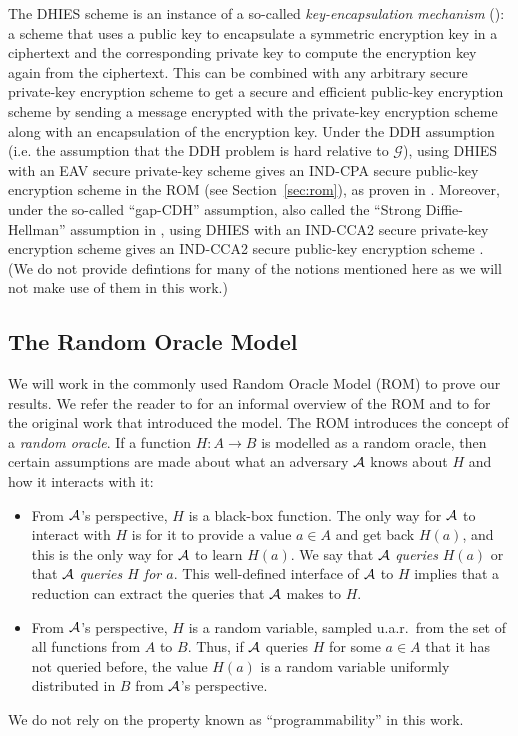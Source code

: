 The DHIES scheme is an instance of a so-called \emph{key-encapsulation mechanism} (\cite[Definition~12.9]{introduction-to-modern-cryptography}): a scheme that uses a public key to encapsulate a symmetric encryption key in a ciphertext and the corresponding private key to compute the encryption key again from the ciphertext. This can be combined with any arbitrary secure private-key encryption scheme to get a secure and efficient public-key encryption scheme by sending a message encrypted with the private-key encryption scheme along with an encapsulation of the encryption key.
Under the DDH assumption (i.e. the assumption that the DDH problem is hard relative to $\mathcal{G}$), using DHIES with an EAV secure private-key scheme gives an IND-CPA secure public-key encryption scheme in the ROM (see Section~\vref{sec:rom}), as proven in \cite[Theorem~12.12]{introduction-to-modern-cryptography}. Moreover, under the so-called ``gap-CDH'' assumption, also called the ``Strong Diffie-Hellman'' assumption in \cite{dhies}, using DHIES with an IND-CCA2 secure private-key encryption scheme gives an IND-CCA2 secure public-key encryption scheme \cite[Theorem~12.22]{introduction-to-modern-cryptography}. (We do not provide defintions for many of the notions mentioned here as we will not make use of them in this work.)


\subsection{The Random Oracle Model} \label{sec:rom}

We will work in the commonly used Random Oracle Model (ROM) to prove our results. We refer the reader to \cite[Chapter 6.5]{introduction-to-modern-cryptography} for an informal overview of the ROM and to \cite{rom} for the original work that introduced the model. The ROM introduces the concept of a \emph{random oracle}. If a function $H : A \to B$ is modelled as a random oracle, then certain assumptions are made about what an adversary $\mathcal{A}$ knows about $H$ and how it interacts with it:
\begin{itemize}
	\item From $\mathcal{A}$'s perspective, $H$ is a black-box function. The only way for $\mathcal{A}$ to interact with $H$ is for it to provide a value $a \in A$ and get back $H(a)$, and this is the only way for $\mathcal{A}$ to learn $H(a)$. We say that $\mathcal{A}$ \emph{queries} $H(a)$ or that $\mathcal{A}$ \emph{queries $H$ for $a$}. This well-defined interface of $\mathcal{A}$ to $H$ implies that a reduction can extract the queries that $\mathcal{A}$ makes to $H$.
	\item From $\mathcal{A}$'s perspective, $H$ is a random variable, sampled u.a.r.\ from the set of all functions from $A$ to $B$. Thus, if $\mathcal{A}$ queries $H$ for some $a \in A$ that it has not queried before, the value $H(a)$ is a random variable uniformly distributed in $B$ from $\mathcal{A}$'s perspective.
\end{itemize}
We do not rely on the property known as ``programmability'' in this work.
